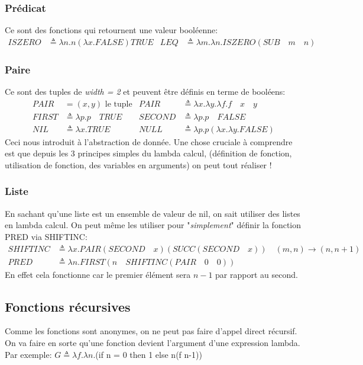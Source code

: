 \documentclass{report}
\begin{document}
\subsubsection{Prédicat}
Ce sont des fonctions qui retournent une valeur booléenne:
\begin{align*}
ISZERO &\triangleq \lambda n.n (\lambda x.FALSE) TRUE & LEQ &\triangleq \lambda m.\lambda n.ISZERO (SUB \quad m \quad n)
\end{align*}

\subsubsection{Paire}
Ce sont des tuples de \textit{width = 2} et peuvent être définis en terme de booléens:
\begin{align*}
PAIR &= (x,y) \text{ le tuple} & PAIR &\triangleq \lambda x.\lambda y.\lambda f.f \quad x \quad y\\
FIRST &\triangleq \lambda p.p \quad TRUE & SECOND &\triangleq \lambda p.p \quad FALSE\\ 
NIL &\triangleq \lambda x.TRUE & NULL &\triangleq \lambda p.p (\lambda x.\lambda y.FALSE)
\end{align*}
Ceci nous introduit à l'abstraction de donnée. Une chose cruciale à comprendre est que depuis les 3 principes simples du lambda calcul, (définition de fonction, utilisation de fonction, des variables en arguments) on peut tout réaliser !

\subsubsection{Liste}
En sachant qu'une liste est un ensemble de valeur de nil, on sait utiliser des listes en lambda calcul. On peut même les utiliser pour "\textit{simplement}" définir la fonction PRED via SHIFTINC:
\begin{align*}
SHIFTINC &\triangleq \lambda x.PAIR (SECOND \quad x) (SUCC (SECOND \quad x)) \quad (m,n) \rightarrow (n,n+1)\\
PRED &\triangleq \lambda n.FIRST (n \quad SHIFTINC (PAIR \quad 0 \quad 0))
\end{align*}
En effet cela fonctionne car le premier élément sera $n-1$ par rapport au second.

\subsection{Fonctions récursives}
Comme les fonctions sont anonymes, on ne peut pas faire d'appel direct récursif. On va faire en sorte qu'une fonction devient l'argument d'une expression lambda. Par exemple:
$G \triangleq \lambda f.\lambda n.$(if n = 0 then 1 else n(f n-1))
\end{document}
